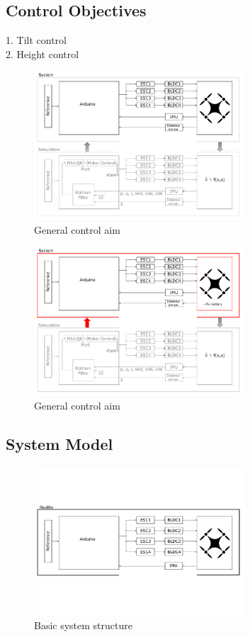 		
\subsection{Control Objectives}
1. Tilt control \\
2. Height control 

\begin{figure}[htb!]
	\centering
	\includegraphics[width=0.7\textwidth]{02_figures/intro_overallGoal}
	\caption{General control aim}
	\label{fig:intro_overallGoal}
\end{figure}

\begin{figure}[htb!]
	\centering
	\includegraphics[width=0.7\textwidth]{02_figures/intro_currentGoal}
	\caption{General control aim}
	\label{fig:intro_currentGoal}
\end{figure}

\clearpage

\subsection{System Model}
\begin{figure}[htb!]
	\centering
	\includegraphics[width=0.7\textwidth]{02_figures/intro_basicSystem}
	\caption{Basic system structure}
	\label{fig:intro_basicSystem}
\end{figure}
\clearpage

